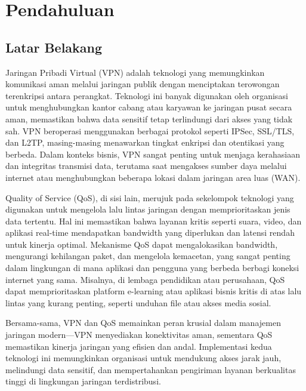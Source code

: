 \section{Pendahuluan}
\subsection{Latar Belakang}
Jaringan Pribadi Virtual (VPN) adalah teknologi yang memungkinkan komunikasi aman melalui jaringan publik dengan menciptakan terowongan terenkripsi antara perangkat. Teknologi ini banyak digunakan oleh organisasi untuk menghubungkan kantor cabang atau karyawan ke jaringan pusat secara aman, memastikan bahwa data sensitif tetap terlindungi dari akses yang tidak sah. VPN beroperasi menggunakan berbagai protokol seperti IPSec, SSL/TLS, dan L2TP, masing-masing menawarkan tingkat enkripsi dan otentikasi yang berbeda. Dalam konteks bisnis, VPN sangat penting untuk menjaga kerahasiaan dan integritas transmisi data, terutama saat mengakses sumber daya melalui internet atau menghubungkan beberapa lokasi dalam jaringan area luas (WAN).

Quality of Service (QoS), di sisi lain, merujuk pada sekelompok teknologi yang digunakan untuk mengelola lalu lintas jaringan dengan memprioritaskan jenis data tertentu. Hal ini memastikan bahwa layanan kritis seperti suara, video, dan aplikasi real-time mendapatkan bandwidth yang diperlukan dan latensi rendah untuk kinerja optimal. Mekanisme QoS dapat mengalokasikan bandwidth, mengurangi kehilangan paket, dan mengelola kemacetan, yang sangat penting dalam lingkungan di mana aplikasi dan pengguna yang berbeda berbagi koneksi internet yang sama. Misalnya, di lembaga pendidikan atau perusahaan, QoS dapat memprioritaskan platform e-learning atau aplikasi bisnis kritis di atas lalu lintas yang kurang penting, seperti unduhan file atau akses media sosial.

Bersama-sama, VPN dan QoS memainkan peran krusial dalam manajemen jaringan modern—VPN menyediakan konektivitas aman, sementara QoS memastikan kinerja jaringan yang efisien dan andal. Implementasi kedua teknologi ini memungkinkan organisasi untuk mendukung akses jarak jauh, melindungi data sensitif, dan mempertahankan pengiriman layanan berkualitas tinggi di lingkungan jaringan terdistribusi.

